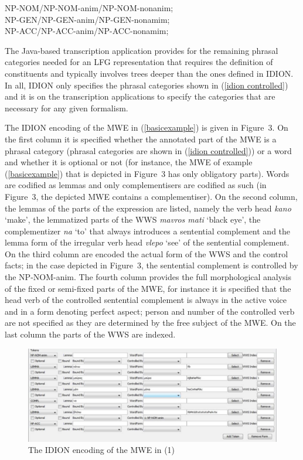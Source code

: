 \documentclass[output=paper,
modfonts
]{langscibook}
\begin{document}
\ea\label{idion controlled}
NP-NOM/NP-NOM-anim/NP-NOM-nonanim;\\ 
NP-GEN/NP-GEN-anim/NP-GEN-nonamim;\\ 
      NP-ACC/NP-ACC-anim/NP-ACC-nonamim; \\
\z

The Java-based transcription application provides for the remaining phrasal categories needed for an LFG representation that requires the definition of constituents and typically involves trees deeper than the ones defined in IDION. 
In all, IDION only specifies the phrasal categories shown in  (\ref{idion controlled}) and it is on the transcription applications to specify the categories that are necessary for any given formalism.

 The IDION encoding of the MWE in (\ref{basicexample}) is given in Figure~3. On the first column it is specified whether the annotated part of the MWE is a phrasal category (phrasal categories are shown in (\ref{idion controlled})) or a word and whether it is optional or not (for instance, the MWE of example (\ref{basicexample}) that is depicted in Figure~3 has only obligatory parts). Words are codified as lemmas and only complementisers are codified as such (in Figure~3, the depicted MWE contains a complementiser).  On the second column, the lemmas of the parts of the expression are listed, namely the verb head \textit{kano} `make', the lemmatized parts of the WWS \textit{mavros mati} `black eye', the complementizer \textit{na} `to' that always  introduces a sentential complement and the lemma form of the irregular verb head \textit{vlepo} `see' of the sentential complement. On the third column are encoded the actual form of the WWS and the control facts; in the case depicted in Figure~3,  the sentential complement is controlled by the NP-NOM-anim. The fourth column provides the full morphological analysis of the fixed or semi-fixed parts of the MWE, for instance it is specified that the head verb of the controlled sentential complement is always in the active voice and in a form denoting perfect aspect; person and number of the controlled verb are not specified as they are determined by the free subject of the MWE. On the last column the parts of the WWS are indexed. 

 \begin{figure}[h!]
  \caption{The IDION encoding of the MWE in (1)}
  \centering
 \includegraphics[width=1\textwidth]{figures/idionencoding}
\end{figure}
 
\end{document}
